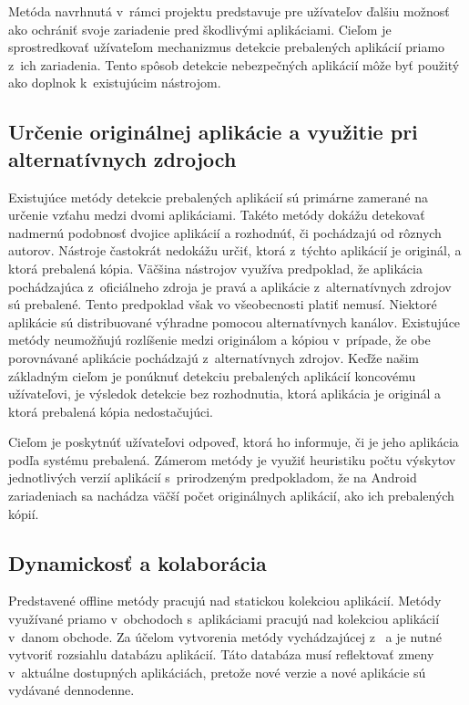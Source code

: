 Metóda navrhnutá v~rámci projektu  predstavuje pre užívateľov ďalšiu možnosť ako ochrániť svoje zariadenie pred škodlivými aplikáciami. Cieľom je sprostredkovať užívateľom mechanizmus detekcie prebalených aplikácií priamo z~ich zariadenia. Tento spôsob detekcie nebezpečných aplikácií môže byť použitý ako doplnok k~existujúcim nástrojom.


\subsection*{Určenie originálnej aplikácie a využitie pri alternatívnych zdrojoch}

Existujúce metódy detekcie prebalených aplikácií sú primárne zamerané na určenie vzťahu medzi dvomi aplikáciami. Takéto metódy dokážu detekovať nadmernú podobnosť dvojice aplikácií a rozhodnúť, či pochádzajú od rôznych autorov. Nástroje častokrát nedokážu určiť, ktorá z~týchto aplikácií je originál, a ktorá prebalená kópia. Väčšina nástrojov využíva predpoklad, že aplikácia pochádzajúca z~oficiálneho zdroja  je pravá a aplikácie z~alternatívnych zdrojov sú prebalené. Tento predpoklad však vo všeobecnosti platiť nemusí. Niektoré aplikácie sú distribuované výhradne pomocou alternatívnych kanálov. Existujúce metódy neumožňujú rozlíšenie medzi originálom a kópiou v~prípade, že obe porovnávané aplikácie pochádzajú z~alternatívnych zdrojov. Keďže našim základným cieľom je ponúknuť detekciu prebalených aplikácií koncovému užívateľovi, je výsledok detekcie bez rozhodnutia, ktorá aplikácia je originál a ktorá prebalená kópia nedostačujúci. 


Cieľom je poskytnúť užívateľovi odpoveď, ktorá ho informuje, či je jeho aplikácia podľa systému  prebalená. 
Zámerom metódy  je využiť heuristiku počtu výskytov jednotlivých verzií aplikácií s~prirodzeným predpokladom, že na Android zariadeniach sa nachádza väčší počet originálnych aplikácií, ako ich prebalených kópií. 

\subsection*{Dynamickosť a kolaborácia}
Predstavené offline metódy pracujú nad statickou kolekciou aplikácií. Metódy využívané priamo v~obchodoch s~aplikáciami pracujú nad kolekciou aplikácií v~danom obchode. Za účelom vytvorenia metódy vychádzajúcej z~ a  je nutné vytvoriť rozsiahlu databázu aplikácií. Táto databáza musí reflektovať zmeny v~aktuálne dostupných aplikáciách, pretože nové verzie a nové aplikácie sú vydávané dennodenne. 


